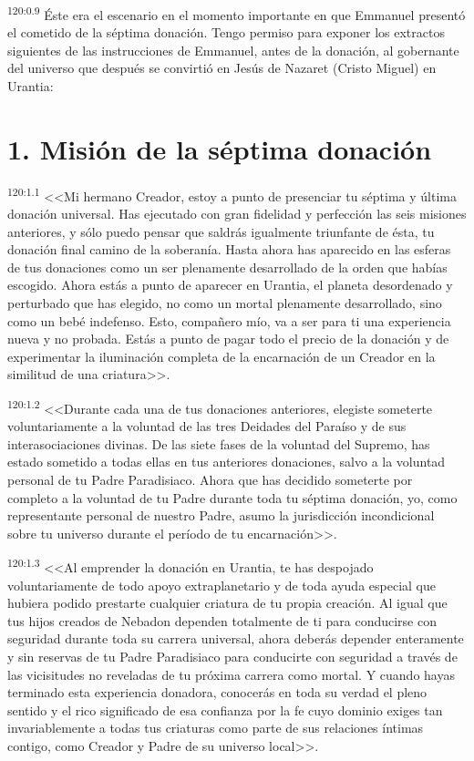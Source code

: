 \par 
\textsuperscript{120:0.9} Éste era el escenario en el momento importante en que Emmanuel presentó el cometido de la séptima donación. Tengo permiso para exponer los extractos siguientes de las instrucciones de Emmanuel, antes de la donación, al gobernante del universo que después se convirtió en Jesús de Nazaret (Cristo Miguel) en Urantia:

\section*{1. Misión de la séptima donación}
\par 
\textsuperscript{120:1.1} <<Mi hermano Creador, estoy a punto de presenciar tu séptima y última donación universal. Has ejecutado con gran fidelidad y perfección las seis misiones anteriores, y sólo puedo pensar que saldrás igualmente triunfante de ésta, tu donación final camino de la soberanía. Hasta ahora has aparecido en las esferas de tus donaciones como un ser plenamente desarrollado de la orden que habías escogido. Ahora estás a punto de aparecer en Urantia, el planeta desordenado y perturbado que has elegido, no como un mortal plenamente desarrollado, sino como un bebé indefenso. Esto, compañero mío, va a ser para ti una experiencia nueva y no probada. Estás a punto de pagar todo el precio de la donación y de experimentar la iluminación completa de la encarnación de un Creador en la similitud de una criatura>>.

\par 
\textsuperscript{120:1.2} <<Durante cada una de tus donaciones anteriores, elegiste someterte voluntariamente a la voluntad de las tres Deidades del Paraíso y de sus interasociaciones divinas. De las siete fases de la voluntad del Supremo, has estado sometido a todas ellas en tus anteriores donaciones, salvo a la voluntad personal de tu Padre Paradisiaco. Ahora que has decidido someterte por completo a la voluntad de tu Padre durante toda tu séptima donación, yo, como representante personal de nuestro Padre, asumo la jurisdicción incondicional sobre tu universo durante el período de tu encarnación>>.

\par 
\textsuperscript{120:1.3} <<Al emprender la donación en Urantia, te has despojado voluntariamente de todo apoyo extraplanetario y de toda ayuda especial que hubiera podido prestarte cualquier criatura de tu propia creación. Al igual que tus hijos creados de Nebadon dependen totalmente de ti para conducirse con seguridad durante toda su carrera universal, ahora deberás depender enteramente y sin reservas de tu Padre Paradisiaco para conducirte con seguridad a través de las vicisitudes no reveladas de tu próxima carrera como mortal. Y cuando hayas terminado esta experiencia donadora, conocerás en toda su verdad el pleno sentido y el rico significado de esa confianza por la fe cuyo dominio exiges tan invariablemente a todas tus criaturas como parte de sus relaciones íntimas contigo, como Creador y Padre de su universo local>>.

